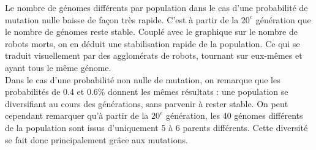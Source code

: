 \documentclass[a4paper]{article}
\begin{document}
Le nombre de génomes différents par population dans le cas d'une probabilité de mutation nulle baisse de façon très rapide. C'est à partir de la $20^{e}$ génération que le nombre de génomes reste stable. Couplé avec le graphique sur le nombre de robots morts, on en déduit une stabilisation rapide de la population. Ce qui se traduit visuellement par des agglomérats de robots, tournant sur eux-mêmes et ayant tous le même génome.\\
Dans le cas d'une probabilité non nulle de mutation, on remarque que les probabilités de 0.4 et 0.6\% donnent les mêmes résultats : une population se diversifiant au cours des générations, sans parvenir à rester stable. On peut cependant remarquer qu'à partir de la $20^{e}$ génération, les 40 génomes différents de la population sont issus d'uniquement 5 à 6 parents différents. Cette diversité se fait donc principalement grâce aux mutations.
\newpage
\end{document}
